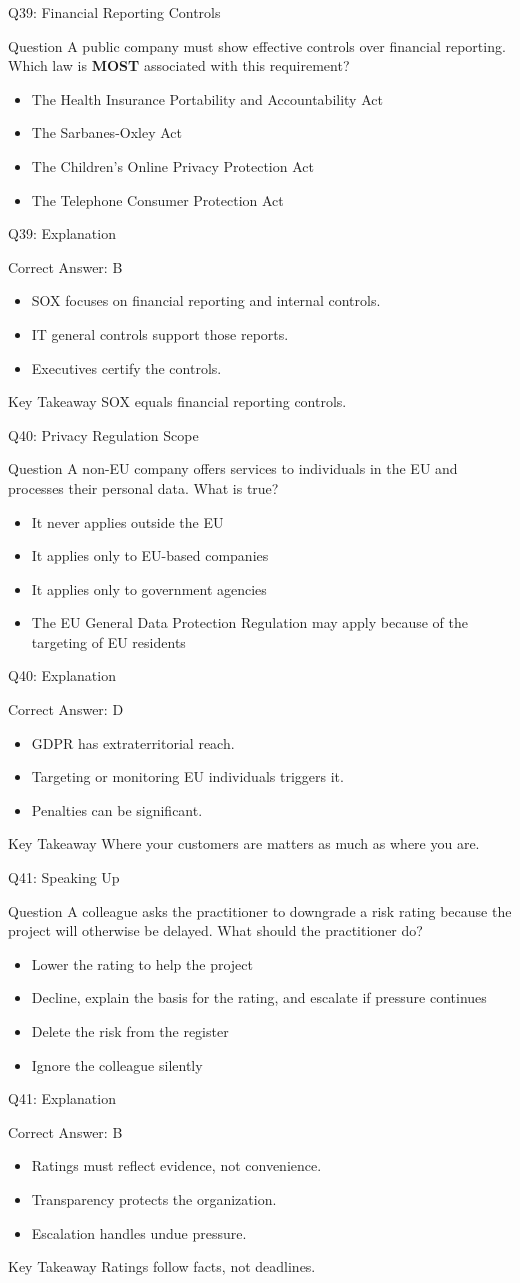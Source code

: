 \documentclass[aspectratio=169]{beamer}
\newcommand{\hq}[7]{%
	\begin{frame}{Q#1: #2}
		\begin{block}{Question}
			#3
		\end{block}
		\begin{itemize}
			#4
		\end{itemize}
	\end{frame}
	\begin{frame}{Q#1: Explanation}
		\begin{block}{Correct Answer: #5}
			\begin{itemize}
				#6
			\end{itemize}
		\end{block}
		\begin{alertblock}{Key Takeaway}
			#7
		\end{alertblock}
	\end{frame}
}
\begin{document}
	\hq{39}{Financial Reporting Controls}
	{A public company must show effective controls over financial reporting. Which law is \textbf{MOST} associated with this requirement?}
	{\item[\textbf{(A)}] The Health Insurance Portability and Accountability Act
		\item[\textbf{(B)}] The Sarbanes-Oxley Act
		\item[\textbf{(C)}] The Children's Online Privacy Protection Act
		\item[\textbf{(D)}] The Telephone Consumer Protection Act}
	{B}
	{\item SOX focuses on financial reporting and internal controls.
		\item IT general controls support those reports.
		\item Executives certify the controls.}
	{SOX equals financial reporting controls.}
	
	\hq{40}{Privacy Regulation Scope}
	{A non-EU company offers services to individuals in the EU and processes their personal data. What is true?}
	{\item[\textbf{(A)}] It never applies outside the EU
		\item[\textbf{(B)}] It applies only to EU-based companies
		\item[\textbf{(C)}] It applies only to government agencies
		\item[\textbf{(D)}] The EU General Data Protection Regulation may apply because of the targeting of EU residents}
	{D}
	{\item GDPR has extraterritorial reach.
		\item Targeting or monitoring EU individuals triggers it.
		\item Penalties can be significant.}
	{Where your customers are matters as much as where you are.}
	
	\hq{41}{Speaking Up}
	{A colleague asks the practitioner to downgrade a risk rating because the project will otherwise be delayed. What should the practitioner do?}
	{\item[\textbf{(A)}] Lower the rating to help the project
		\item[\textbf{(B)}] Decline, explain the basis for the rating, and escalate if pressure continues
		\item[\textbf{(C)}] Delete the risk from the register
		\item[\textbf{(D)}] Ignore the colleague silently}
	{B}
	{\item Ratings must reflect evidence, not convenience.
		\item Transparency protects the organization.
		\item Escalation handles undue pressure.}
	{Ratings follow facts, not deadlines.}
	
\end{document}

